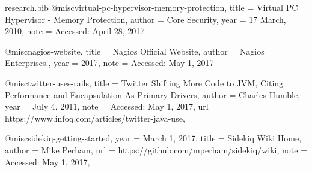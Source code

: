 \documentclass{article}
\begin{document}
\begin{filecontents*}{research.bib}
	@misc{virtual-pc-hypervisor-memory-protection,
		title = {Virtual PC Hypervisor - Memory Protection},
		author = {Core Security},
		year = {17 March, 2010},
		note = {Accessed: April 28, 2017}
	}

	@misc{nagios-website,
		title = {Nagios Official Website},
		author = {Nagios Enterprises.},
		year = {2017},
		note = {Accessed: May 1, 2017}
	}

	@misc{twitter-uses-rails,
		title = {Twitter Shifting More Code to JVM, Citing Performance and Encapsulation As Primary Drivers},
		author = {Charles Humble},
		year = {July 4, 2011},
		note = {Accessed: May 1, 2017},
		url = {https://www.infoq.com/articles/twitter-java-use},		
	}

	@misc{sidekiq-getting-started,
		year = {March 1, 2017},
		title = {Sidekiq Wiki Home},
		author = { Mike Perham},
		url = {https://github.com/mperham/sidekiq/wiki},
		note = {Accessed: May 1, 2017},
	}

\end{filecontents*}


\end{document}
